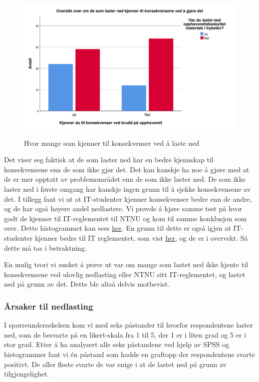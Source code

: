 \begin{figure}[H]
    \centering
    \includegraphics[scale=0.45]{case_1/bilder/konsekvens_lasterned.pdf}
    \label{fig:konsekvens_lasterned}
    \caption[Konsekvens av å laste ned]{Hvor mange som kjenner til konsekvenser ved å laste ned}
\end{figure}

Det viser seg faktisk at de som laster ned har en bedre kjennskap til konsekvensene enn de som ikke gjør det. Det kan kanskje ha noe å gjøre med at de er mer opptatt av problemområdet enn de som ikke laster ned. De som ikke laster ned i første omgang har kanskje ingen grunn til å sjekke konsekvensene av det. I tillegg fant vi ut at IT-studenter kjenner konsekvenser bedre enn de andre, og de har også høyere andel nedlastere. Vi prøvde å kjøre samme test på hvor godt de kjenner til IT-reglementet til NTNU \cite{ITReg} og kom til samme konklusjon som over. Dette histogrammet kan sees \hyperref[fig:reglement-lasterned]{her}. En grunn til dette er også igjen at IT-studenter kjenner bedre til IT reglementet, som vist \hyperref[fig:reglement-fakultet]{her}, og de er i overvekt. Så dette må tas i betraktning. 

En mulig teori vi ønsket å prøve ut var om mange som lastet ned ikke kjente til konsekvensene ved ulovlig nedlasting eller NTNU sitt IT-reglementet, og lastet ned på grunn av det. Dette ble altså delvis motbevist.

\subsubsection{Årsaker til nedlasting}
I spørreundersøkelsen kom vi med seks påstander til hvorfor respondentene laster ned, som de besvarte på en likert-skala fra 1 til 5, der 1 er i liten grad og 5 er i stor grad. Etter å ha analysert alle seks påstandene ved hjelp av SPSS og histogrammer fant vi én påstand som hadde en graftopp der respondentene svarte positivt. De aller fleste svarte de var enige i at de lastet ned på grunn av tilgjengelighet.

